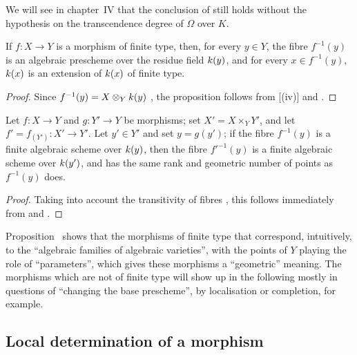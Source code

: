 \begin{rmk}[6.4.10]
\label{1.6.4.10}
We will see in chapter~IV that the conclusion of  still holds without the hypothesis on the transcendence degree of $\Omega$ over $K$.
\end{rmk}

\begin{prop}[6.4.11]
\label{1.6.4.11}
If $f\colon X\to Y$ is a morphism of finite type, then, for every $y\in Y$, the fibre $f^{-1}(y)$ is an algebraic prescheme over the residue field $k(y)$, and for every $x\in f^{-1}(y)$, $k(x)$ is an extension of $k(x)$ of finite type.
\end{prop}

\begin{proof}
\label{proof-1.6.4.11}
Since $f^{-1}(y)=X\otimes_Yk(y)$ , the proposition follows from [(iv)] and .
\end{proof}

\begin{prop}[6.4.12]
\label{1.6.4.12}
Let $f\colon X\to Y$ and $g\colon Y'\to Y$ be morphisms;
set $X'=X\times_Y Y'$, and let $f'=f_{(Y')}\colon X'\to Y'$.
Let $y'\in Y'$ and set $y=g(y')$;
if the fibre $f^{-1}(y)$ is a finite algebraic scheme over $k(y)$, then the fibre $f'^{-1}(y)$ is a finite algebraic scheme over $k(y')$, and has the same rank and geometric number of points as $f^{-1}(y)$ does.
\end{prop}

\begin{proof}
\label{proof-1.6.4.12}
Taking into account the transitivity of fibres , this follows immediately from  and .
\end{proof}

\begin{env}[6.4.13]
\label{1.6.4.13}
Proposition~ shows that the morphisms of finite type that correspond, intuitively, to the ``algebraic families of algebraic varieties'', with the points of $Y$ playing the role of ``parameters'', which gives these morphisms a ``geometric'' meaning.
The morphisms which are not of finite type will show up in the following mostly in questions of ``changing the base prescheme'', by localisation or completion, for example.
\end{env}

\subsection{Local determination of a morphism}

